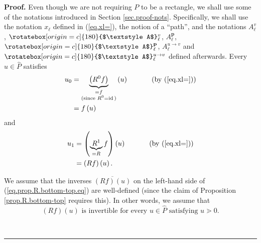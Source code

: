 \documentclass[numbers=enddot,12pt,final,onecolumn,notitlepage]{scrartcl}%
\theoremstyle{definition}
\newenvironment{verlong}{}{}
\newcommand{\upslack}{\mathchoice{\rotatebox[origin=c]{180}{$\displaystyle A$}}{\rotatebox[origin=c]{180}{$\textstyle A$}}{\rotatebox[origin=c]{180}{$\scriptstyle A$}}{\rotatebox[origin=c]{180}{$\scriptscriptstyle A$}}}
\newcommand{\downslack}{A}
\newenvironment{proof}[1][Proof]{\noindent\textbf{#1.} }{\ \rule{0.5em}{0.5em}}
\begin{document}
\begin{verlong}
\begin{proof}
Even though we are not requiring $P$ to be a rectangle, we shall use some of
the notations introduced in Section \ref{sec.proof-nots}. Specifically, we
shall use the notation $x_{\ell}$ defined in (\ref{eq.xl=}), the notion of a
\textquotedblleft path\textquotedblright, and the notations $\downslack_{\ell
}^{v}$, $\upslack_{\ell}^{v}$, $\downslack_{\ell}^{\mathbf{p}}$,
$\upslack_{\ell}^{\mathbf{p}}$, $\downslack_{\ell}^{u\rightarrow v}$ and
$\upslack_{\ell}^{u\rightarrow v}$ defined afterwards. Every $u\in\widehat{P}$
satisfies%
\begin{align}
u_{0}  &  =\underbrace{\left(  R^{0}f\right)  }_{\substack{=f\\\text{(since
}R^{0}=\operatorname*{id}\text{)}}}\left(  u\right)
\ \ \ \ \ \ \ \ \ \ \left(  \text{by (\ref{eq.xl=})}\right) \nonumber\\
&  =f\left(  u\right)  \label{pf.prop.R.bottom-top.u0=}%
\end{align}
and%
\begin{align}
u_{1}  &  =\left(  \underbrace{R^{1}}_{=R}f\right)  \left(  u\right)
\ \ \ \ \ \ \ \ \ \ \left(  \text{by (\ref{eq.xl=})}\right) \nonumber\\
&  =\left(  Rf\right)  \left(  u\right)  . \label{pf.prop.R.bottom-top.u1=}%
\end{align}


We assume that the inverses $\overline{\left(  Rf\right)  \left(  u\right)  }$
on the left-hand side of (\ref{eq.prop.R.bottom-top.eq}) are well-defined
(since the claim of Proposition \ref{prop.R.bottom-top} requires this). In
other words, we assume that%
\begin{equation}
\left(  Rf\right)  \left(  u\right)  \text{ is invertible for every }%
u\in\widehat{P}\text{ satisfying }u\gtrdot0. \label{pf.prop.R.bottom-top.ible}%
\end{equation}



\end{proof}
\end{verlong}
\end{document}
